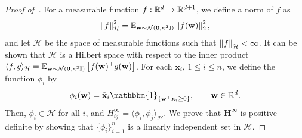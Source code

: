\begin{proof}[Proof of~]
For a measurable function $f: \mathbb{R}^d \rightarrow \mathbb{R}^{d+1}$, we define a norm of $f$ as 
\begin{equation*}
    \left\lVert f\right\rVert_\mathcal{H}^2 = \mathbb{E}_{\mathbf{w} \sim \mathcal{N}(\mathbf{0}, \kappa^2 \mathbf{I})} \left\lVert f(\mathbf{w})\right\rVert_2^2,
\end{equation*}
and let $\mathcal{H}$ be the space of measurable functions such that $\left\lVert f\right\rVert_\mathcal{H} < \infty$. It can be shown that $\mathcal{H}$ is a Hilbert space with respect to the inner product $\langle f, g \rangle_\mathcal{H} = \mathbb{E}_{\mathbf{w} \sim \mathcal{N}(\mathbf{0}, \kappa^2 \mathbf{I})} \left[f(\mathbf{w})^\top g(\mathbf{w})\right]$. For each $\mathbf{x}_i$, $1 \leq i \leq n$, we define the function $\phi_i$ by
\begin{equation*}
    \phi_i(\mathbf{w}) = \tilde{\mathbf{x}}_i \mathbbm{1}_{\{\mathbf{w}^\top \mathbf{x}_i \geq 0\}}, \qquad \mathbf{w} \in \R^d.
\end{equation*}
Then, $\phi_i \in \mathcal{H}$ for all $i$, and $H_{ij}^\infty = \langle \phi_i, \phi_j \rangle_{\mathcal{H}}$. We prove that ${\mathbf{H}}^\infty$ is positive definite by showing that $\{\phi_i\}_{i=1}^n$ is a linearly independent set in $\mathcal{H}$.


\end{proof}

